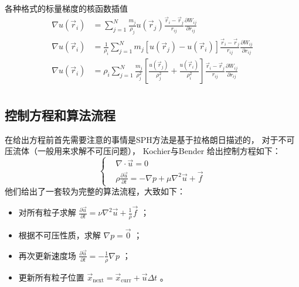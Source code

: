 \begin{frame}
    \begin{block}{各种格式的标量梯度的核函数插值}
        \begin{equation}
            \begin{aligned}
                \nabla u(\vec{r}_i) &= 
                    \sum_{j=1}^N
                    \frac{m_j}{\rho_j} u(\vec{r}_j)\frac{\vec{r}_i-\vec{r}_j}{r_{ij}}
                    \frac{\partial W_{ij}}{\partial r_{ij}}\\
                \nabla u(\vec{r}_i) &=
                    \frac{1}{\rho_i}\sum_{j=1}^N m_j [u(\vec{r}_j) - u(\vec{r}_i)]
                    \frac{\vec{r}_i-\vec{r}_j}{r_{ij}}\frac{\partial W_{ij}}{\partial r_{ij}}\\
                \nabla u(\vec{r}_i) &= \rho_i
                    \sum_{j=1}^N \frac{m_j}{\rho_j^2} 
                    \left[
                        \frac{u(\vec{r}_j)}{\rho_j^2} + \frac{u(\vec{r}_i)}{\rho_i^2}
                    \right]
                    \frac{\vec{r}_i-\vec{r}_j}{r_{ij}}\frac{\partial W_{ij}}{\partial r_{ij}}\\
            \end{aligned}
        \end{equation}
    \end{block}
\end{frame}

\subsection{控制方程和算法流程}

\begin{frame}
    在给出方程前首先需要注意的事情是SPH方法是基于拉格朗日描述的，
    对于不可压流体（一般用来求解不可压问题），
    Kochier与Bender \cite{koschier_smoothed_2020} 给出控制方程如下：
    \begin{equation}
        \begin{cases}
            &\nabla\cdot\vec{u} = 0\\
            &\rho \frac{\partial \vec{u}}{\partial t} = 
            -\nabla p + \mu \nabla^2 \vec{u} + \vec{f}
        \end{cases}
    \end{equation}
    他们给出了一套较为完整的算法流程，大致如下：
    \begin{itemize}
        \item 对所有粒子求解 $\frac{\partial \vec{u}}{\partial t}=\nu\nabla^2\vec{u}+\frac{1}{\rho}\vec{f}$ ；
        \item 根据不可压性质，求解 $\nabla p=\vec{0}$ ；
        \item 再次更新速度场 $\frac{\partial \vec{u}}{\partial t}=-\frac{1}{\rho}\nabla p$ ；
        \item 更新所有粒子位置 $\vec{x}_{\text{next}}=\vec{x}_{\text{curr}}+\vec{u}\Delta t$ 。
    \end{itemize}
\end{frame}

